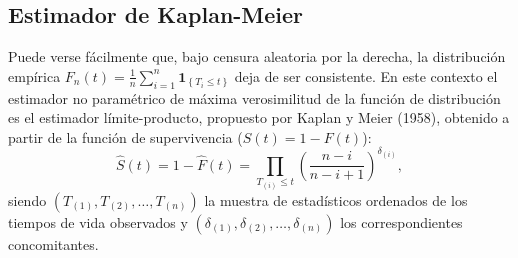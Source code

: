 \documentclass[
]{book}
\renewcommand{\mathbf}[1]{\symbf{#1}}
\theoremstyle{break}
\theoremstyle{nonumberplain}
\begin{document}
\subsection{Estimador de Kaplan-Meier}\label{estimador-de-kaplan-meier}

Puede verse fácilmente que, bajo censura aleatoria por la derecha, la
distribución empírica \(F_n\left( t \right) =\frac{1}{n}
\sum_{i=1}^{n}\mathbf{1}_{\left\{ T_i\leq t\right\} }\) deja de ser
consistente. En este contexto el estimador no paramétrico de máxima
verosimilitud de la función de distribución es el estimador
límite-producto, propuesto por Kaplan y Meier (1958), obtenido
a partir de la función de supervivencia
(\(S\left( t \right) = 1-F\left( t \right)\)):
\[\hat{S}\left( t \right) = 1-\hat{F}\left( t \right) =
\prod_{T_{(i)}\leq t}\left( \frac{n-i}{n-i+1} \right)^{\delta _{(i)}},\]
siendo \(\left( T_{(1)},T_{\left( 2 \right)},\ldots ,T_{\left(
n \right)} \right)\) la muestra de estadísticos ordenados de los tiempos
de vida observados y \(\left( \delta _{(1)},\delta _{\left(2 \right)},
\ldots ,\delta _{(n)} \right)\) los correspondientes concomitantes.
\end{document}

